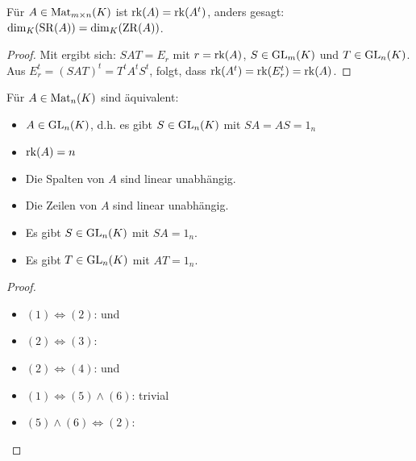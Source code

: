 \begin{proposition}
	Für $A\in \operatorname{Mat}_{m\times n}(K)$ ist $\operatorname{rk}(A)=\operatorname{rk}(A^t)$, anders gesagt: $\dim_K(\operatorname{SR}(A))=\dim_K(\operatorname{ZR}(A))$.
\end{proposition}
\begin{proof}
	Mit  ergibt sich: $SAT=E_r$ mit $r=\operatorname{rk}(A)$, $S\in \operatorname{GL}_m(K)$ und $T\in \operatorname{GL}_n(K)$. Aus $E_r^t=(SAT)^t=T^tA^tS^t$, folgt, 
	dass $\operatorname{rk}(A^t)=\operatorname{rk}(E_r^t)=\operatorname{rk}(A)$.
\end{proof}

\begin{conclusion}
	Für $A\in \operatorname{Mat}_n(K)$ sind äquivalent:
	\begin{itemize}
		\item $A\in \operatorname{GL}_n(K)$, d.h. es gibt $S\in \operatorname{GL}_n(K)$ mit $SA=AS=1_n$
		\item $\operatorname{rk}(A)=n$
		\item Die Spalten von $A$ sind linear unabhängig.
		\item Die Zeilen von $A$ sind linear unabhängig.
		\item Es gibt $S\in \operatorname{GL}_n(K)$ mit $SA=1_n$.
		\item Es gibt $T\in \operatorname{GL}_n(K)$ mit $AT=1_n$.
	\end{itemize}
\end{conclusion}
\begin{proof}
	\begin{itemize}
		\item $(1)\iff (2)$:  und 
		\item $(2)\iff (3)$: 
		\item $(2)\iff (4)$:  und 
		\item $(1)\iff (5)\land (6)$: trivial
		\item $(5)\land (6)\iff (2)$: 
	\end{itemize}
\end{proof}